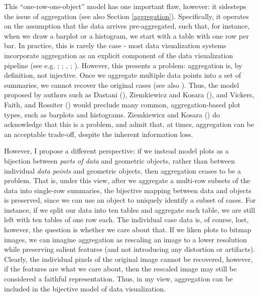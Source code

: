 \documentclass[
  openany]{book}
\theoremstyle{definition}
\theoremstyle{definition}
\theoremstyle{definition}
\theoremstyle{definition}
\theoremstyle{remark}
\begin{document}
This ``one-row-one-object'' model has one important flaw, however: it sidesteps the issue of aggregation (see also Section \ref{aggregation}). Specifically, it operates on the assumption that the data arrives pre-aggregated, such that, for instance, when we draw a barplot or a histogram, we start with a table with one row per bar. In practice, this is rarely the case - most data visualization systems incorporate aggregation as an explicit component of the data visualization pipeline (see e.g. ; ; , ; ). However, this presents a problem: aggregation is, by definition, not injective. Once we aggregate multiple data points into a set of summaries, we cannot recover the original cases (see also ). Thus, the model proposed by authors such as Dastani (), Ziemkiewicz and Kosara (), and Vickers, Faith, and Rossiter () would preclude many common, aggregation-based plot types, such as barplots and histograms. Ziemkiewicz and Kosara () do acknowledge that this is a problem, and admit that, at times, aggregation can be an acceptable trade-off, despite the inherent information loss.

However, I propose a different perspective: if we instead model plots as a bijection between \emph{parts of data} and geometric objects, rather than between individual \emph{data points} and geometric objects, then aggregation ceases to be a problem. That is, under this view, after we aggregate a multi-row subsets of the data into single-row summaries, the bijective mapping between data and objects is preserved, since we can use an object to uniquely identify a subset of cases. For instance, if we split our data into ten tables and aggregate each table, we are still left with ten tables of one row each. The individual case data is, of course, lost, however, the question is whether we care about that. If we liken plots to bitmap images, we can imagine aggregation as rescaling an image to a lower resolution while preserving salient features (and not introducing any distortion or artifacts). Clearly, the individual pixels of the original image cannot be recovered, however, if the features are what we care about, then the rescaled image may still be considered a faithful representation. Thus, in my view, aggregation can be included in the bijective model of data visualization.
\end{document}
